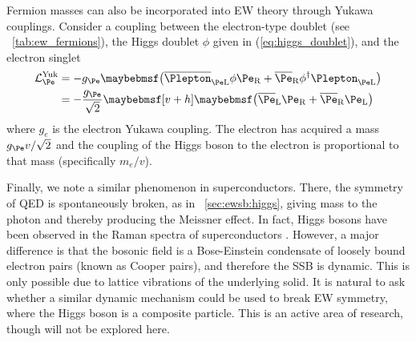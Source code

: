Fermion masses can also be incorporated into EW theory through Yukawa couplings.
Consider a coupling between the electron-type  doublet (see 
\Table~\ref{tab:ew_fermions}), the Higgs doublet $\phi$ given in 
(\ref{eq:higgs_doublet}), and the electron  singlet
\begin{align}
	\mathcal{L}_{\Pe}^{\text{Yuk}} &= -g_{\Pe} \parenths{\overline{\Plepton}_{\Pe \text{L}} \phi \Pe_{\text{R}} + \overline{\Pe}_{\text{R}} \phi^{\dagger} \Plepton_{\Pe \text{L}}} \\
	&= -\frac{g_{\Pe}}{\sqrt{2}} \sqbracs{v + h} \parenths{\overline{\Pe}_{\text{L}} \Pe_{\text{R}} + \overline{\Pe}_{\text{R}} \Pe_{\text{L}}}
\end{align}
where $g_e$ is the electron Yukawa coupling. The electron has acquired a mass 
$g_{\Pe}v/\sqrt{2}$ and the coupling of the Higgs boson to the electron is proportional 
to that mass (specifically $m_e/v$).

Finally, we note a similar phenomenon in superconductors. There, the  symmetry 
of QED is spontaneously broken, as in \Section~\ref{sec:ewsb:higgs}, giving mass to 
the photon and thereby producing the Meissner effect. In fact, Higgs bosons have been 
observed in the Raman spectra of superconductors \cite{Superconductivity}. However, a 
major difference is that the bosonic field is a Bose-Einstein condensate of loosely bound 
electron pairs (known as Cooper pairs), and therefore the SSB is dynamic. This is 
only possible due to lattice vibrations of the underlying solid. It is natural to ask 
whether a similar dynamic mechanism could be used to break EW symmetry, where the 
Higgs boson is a composite particle. This is an active area of research, though will not 
be explored here.
